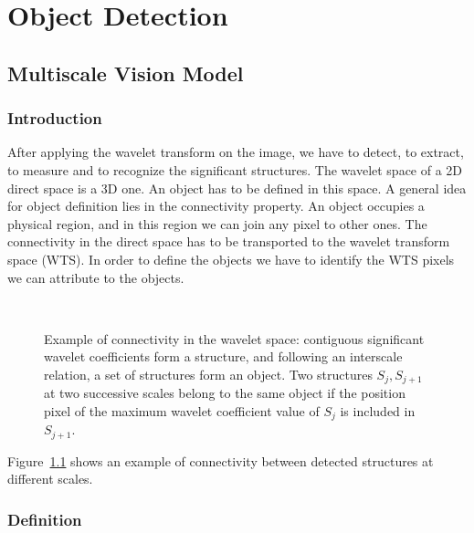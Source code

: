 \chapter{\proj Object Detection}
\label{ch_mvm}



\section{Multiscale Vision Model}
\label{sect_detect}
\subsection{Introduction}
After applying the wavelet transform on the image, we have to 
detect, to extract, to measure and to recognize the significant 
structures. The wavelet space of a 2D direct space 
is a 3D one. An object has to be defined in 
this space.  A general idea for object definition lies in the connectivity 
property. An object occupies a physical region, and in this region we 
can join any pixel to other ones. The connectivity in the direct space 
has to be transported to the wavelet transform space (WTS). In order to 
define the objects we have to identify the WTS pixels we can attribute to 
the objects.

\begin{figure}[htb]
\centerline{
\hbox{ 
}}
\label{fig_detect_graph}
\caption{Example of connectivity in the wavelet space: contiguous significant wavelet 
coefficients
form a structure, and following an interscale relation, a set of structures form
an object. Two structures $S_{j},S_{j+1}$ at two successive scales  
belong to the same object if the position pixel of the maximum wavelet
coefficient value of $S_j$ is  included in $S_{j+1}$.}
\end{figure}

Figure~\ref{fig_detect_graph} shows an example of connectivity between 
detected structures at different scales.

\subsection{Definition}

